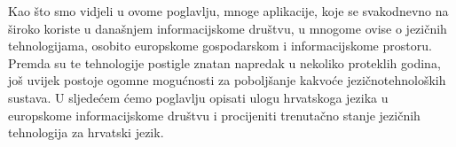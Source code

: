\begin{multicols}{2}

Kao što smo vidjeli u ovome poglavlju, mnoge aplikacije, koje se svakodnevno na široko koriste u današnjem informacijskome društvu, u mnogome ovise o jezičnih tehnologijama, osobito europskome gospodarskom i informacijskome prostoru. Premda su te tehnologije postigle znatan napredak u nekoliko proteklih godina, još uvijek postoje ogomne mogućnosti za poboljšanje kakvoće jezičnotehnoloških sustava. U sljedećem ćemo poglavlju opisati ulogu hrvatskoga jezika u europskome informacijskome društvu i procijeniti trenutačno stanje jezičnih tehnologija za hrvatski jezik.

\end{multicols}

\clearpage



